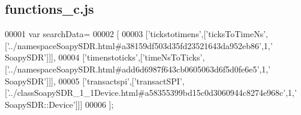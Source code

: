 \subsection{functions\+\_\+c.\+js}
\label{functions__c_8js_source}

\begin{DoxyCode}
00001 var searchData=
00002 [
00003   [\textcolor{stringliteral}{'tickstotimens'},[\textcolor{stringliteral}{'ticksToTimeNs'},[\textcolor{stringliteral}{'../namespaceSoapySDR.html#a38159df503d35fd23521643da952eb86'},1,\textcolor{stringliteral}{'
      SoapySDR'}]]],
00004   [\textcolor{stringliteral}{'timenstoticks'},[\textcolor{stringliteral}{'timeNsToTicks'},[\textcolor{stringliteral}{'../namespaceSoapySDR.html#add6d6987f643cb0605063d6f5d0fe6e5'},1,\textcolor{stringliteral}{'
      SoapySDR'}]]],
00005   [\textcolor{stringliteral}{'transactspi'},[\textcolor{stringliteral}{'transactSPI'},[\textcolor{stringliteral}{'../classSoapySDR\_1\_1Device.html#a58355399bd15c0d3060944c8274e968c'},1,\textcolor{stringliteral}{'
      SoapySDR::Device'}]]]
00006 ];
\end{DoxyCode}

